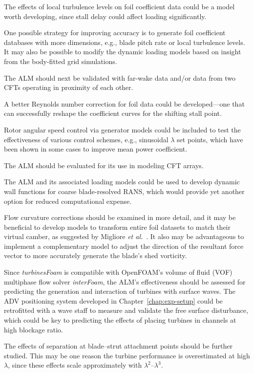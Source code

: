 The effects of local turbulence levels on foil coefficient data could be a model
worth developing, since stall delay could affect loading significantly.

One possible strategy for improving accuracy is to generate foil coefficient
databases with more dimensions, e.g., blade pitch rate or local turbulence
levels. It may also be possible to modify the dynamic loading models based on
insight from the body-fitted grid simulations.

The ALM should next be validated with far-wake data and/or data from two CFTs
operating in proximity of each other.

A better Reynolds number correction for foil data could be developed---one that
can successfully reshape the coefficient curves for the shifting stall point.

Rotor angular speed control via generator models could be included to test the
effectiveness of various control schemes, e.g., sinusoidal $\lambda$ set points,
which have been shown in some cases to improve mean power coefficient.

The ALM should be evaluated for its use in modeling CFT arrays.

The ALM and its associated loading models could be used to develop dynamic wall
functions for coarse blade-resolved RANS, which would provide yet another option
for reduced computational expense.

Flow curvature corrections should be examined in more detail, and it may be
beneficial to develop models to transform entire foil datasets to match their
virtual camber, as suggested by Migliore \emph{et al.}~\cite{Migliore1980}. It
also may be advantageous to implement a complementary model to adjust the
direction of the resultant force vector to more accurately generate the blade's
shed vorticity.

Since \textit{turbinesFoam} is compatible with OpenFOAM's volume of fluid (VOF)
multiphase flow solver \textit{interFoam}, the ALM's effectiveness should be
assessed for predicting the generation and interaction of turbines with surface
waves. The ADV positioning system developed in Chapter~\ref{chap:exp-setup}
could be retrofitted with a wave staff to measure and validate the free surface
disturbance, which could be key to predicting the effects of placing turbines in
channels at high blockage ratio.

The effects of separation at blade--strut attachment points should be further
studied. This may be one reason the turbine performance is overestimated at high
$\lambda$, since these effects scale approximately with
$\lambda^2$--$\lambda^3$.

